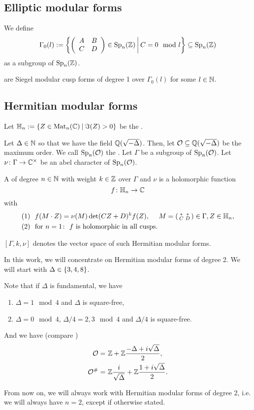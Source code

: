 \subsection{Elliptic modular forms}

We define
\[ \Gamma_0(l) := \Set{\SimpleMatrix{A}{B}{C}{D} \in \Sp_n(\Z)}{C = 0 \mod l} \subseteq \Sp_n(\Z) \]
as a subgroup of $\operatorname{Sp}_n(\mathbb{Z})$.

 are Siegel modular cusp forms of degree 1 over $\Gamma_0(l)$ for some $l \in \mathbb{N}$.

\subsection{Hermitian modular forms}

Let $\HalfPlane_n :=  \Set{ Z \in \M_n(\C) }{ \Im(Z) > 0}$ be the .


Let $\Delta \in \mathbb{N}$ so that we have the field $\mathbb{Q}(\sqrt{-\Delta})$.
Then, let $\mathcal{O} \subseteq \mathbb{Q}(\sqrt{-\Delta})$ be the maximum order.
We call $\operatorname{Sp}_n(\mathcal{O})$ the .
Let $\Gamma$ be a subgroup of $\operatorname{Sp}_n(\mathcal{O})$.
Let $\nu \colon \Gamma \rightarrow \mathbb{C}^\times$ be an abel character of $\operatorname{Sp}_n(\mathcal{O})$.

A 
of degree $n\in\mathbb{N}$
with weight $k\in \mathbb{Z}$
over $\Gamma$ and $\nu$
is a holomorphic function
\[ f \colon \mathbb{H}_n \rightarrow \mathbb{C} \]
with
\begin{align*}
(1) \ \ & f(M \cdot Z) = \nu(M) \det(CZ + D)^k f(Z), \ \ \ \ M = \left( \begin{smallmatrix} * & * \\ C & D \end{smallmatrix} \right) \in \Gamma, Z \in \mathbb{H}_n , \\
(2) \ \ & \text{for } n = 1 \colon \ \text{$f$ is holomorphic in all cusps} .
\end{align*}

$[\Gamma, k, \nu]$ denotes the vector space of such Hermitian modular forms.

In this work, we will concentrate on Hermitian modular forms of degree 2. We will start with $\Delta \in \Set{3,4,8}$.

Note that if $\Delta$ is fundamental, we have
\begin{enumerate}
\item $\Delta = 1 \mod 4$ and $\Delta$ is square-free,
\item $\Delta = 0 \mod 4$, $\Delta/4 = 2,3 \mod 4$ and $\Delta/4$ is square-free.
\end{enumerate}
And we have (compare \cite{Dern01Herm})
\begin{align*}
\mathcal{O} = &\ \mathbb{Z} +  \mathbb{Z} \frac{-\Delta+i\sqrt{\Delta}}{2} , \\
\mathcal{O}^\# = & \ \mathbb{Z} \frac{i}{\sqrt{\Delta}} + \mathbb{Z} \frac{1 + i\sqrt{\Delta}}{2} .
\end{align*}

From now on, we will always work with Hermitian modular forms of degree 2, i.e. we will always have $n=2$, except if otherwise stated.

